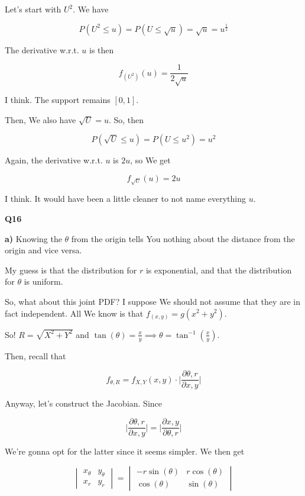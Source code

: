 \documentclass{article}
\begin{document}
			Let's start with $U^2$. We have
			
			\[ P(U^2\le u) = P(U\le \sqrt{u}) = \sqrt{u} = u^{\frac{1}{2}} \]
		
			The derivative w.r.t. $u$ is then
			
			\[ f_{(U^2)}(u) = \frac{1}{2\sqrt{u}} \]
		
			I think. The support remains $[0, 1]$. 
			
			Then, We also have $\sqrt{U} = u$. So, then
			
			\[ P(\sqrt{U}\le u) = P(U\le u^2) = u^2 \]
		
			Again, the derivative w.r.t. $u$ is $2u$, so We get
			
			\[ f_{\sqrt{U}}(u) = 2u \]
			
			I think. It would have been a little cleaner to not name everything $u$.
			
			\hfill
			
		\textbf{Q16}
		
			\textbf{a)} Knowing the $\theta$ from the origin tells You nothing about the distance from the origin and vice versa.
			
			My guess is that the distribution for $r$ is exponential, and that the distribution for $\theta$ is uniform.
			
			So, what about this joint PDF? I suppose We should not assume that they are in fact independent. All We know is that $f_{(x, y)} = g(x^2+y^2)$.
			
			So! $R = \sqrt{X^2+Y^2}$ and $\tan(\theta) = \frac{x}{y} \implies \theta = \tan^{-1}(\frac{x}{y})$.
		
			Then, recall that
			
			\[ f_{\theta, R} = f_{X, Y}(x, y)\cdot \bigg|\frac{\partial \theta, r}{\partial x, y} \bigg| \]
		
			Anyway, let's construct the Jacobian. Since
			
			\[ \bigg|\frac{\partial \theta, r}{\partial x, y} \bigg| = \bigg|\frac{\partial x, y}{\partial \theta, r} \bigg|  \]
			
			We're gonna opt for the latter since it seems simpler. We then get
			
			\[ 
			\begin{vmatrix}
			x_{\theta} & y_{\theta} \\
			x_r & y_r
			\end{vmatrix} = 
			\begin{vmatrix}
			-r\sin(\theta) & r\cos(\theta) \\
			\cos(\theta) & \sin(\theta)
			\end{vmatrix} \]			
			
\end{document}
